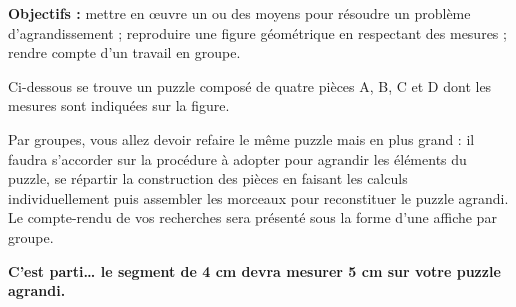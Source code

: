 \begin{changemargin}{-10mm}{-15mm}
\begin{activite}
    {\bf Objectifs :} mettre en \oe uvre un ou des moyens pour résoudre un problème d'agrandissement ; reproduire une figure géométrique en respectant des mesures ; rendre compte d'un travail en groupe.

       Ci-dessous se trouve un puzzle composé de quatre pièces A, B, C et D dont les mesures sont indiquées sur la figure. \\
       \begin{center}
        \end{center}
          Par groupes, vous allez devoir refaire le même puzzle mais en plus grand : il faudra s'accorder sur la procédure à adopter pour agrandir les éléments du puzzle, se répartir la construction des pièces en faisant les calculs individuellement puis assembler les morceaux pour reconstituer le puzzle agrandi. \\
          Le compte-rendu de vos recherches sera présenté sous la forme d’une affiche par groupe.
          \begin{center}
             {\bf C'est parti\dots{} le segment de 4 cm devra mesurer 5 cm sur votre puzzle agrandi.}
          \end{center}
          \bigskip
 \end{activite}
\end{changemargin}